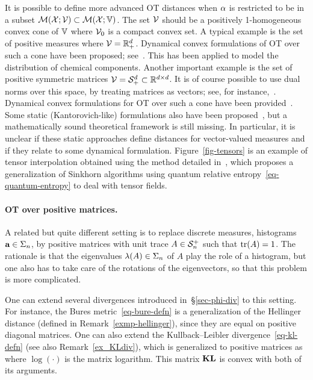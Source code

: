 It is possible to define more advanced OT distances when $\alpha$ is restricted to be in a subset $\mathcal{M}(\mathcal{X};\mathcal{V}) \subset \mathcal{M}(\mathcal{X};\mathbb{V})$. The set $\mathcal{V}$ should be a positively 1-homogeneous convex cone of $\mathbb{V}$
where $\mathcal{V}_0$ is a compact convex set. 
%
A typical example is the set of positive measures where $\mathcal{V}=\mathbb{R}_+^d$. Dynamical convex formulations of OT over such a cone have been proposed; see~\citep{MatthesPositive}. This has been applied to model the distribution of chemical components. 
%
Another important example is the set of positive symmetric matrices $\mathcal{V}=\mathcal{S}_+^d \subset \mathbb{R}^{d \times d}$. It is of course possible to use dual norms over this space, by treating matrices as vectors; see, for instance,~\citep{Ning2014metrics}. Dynamical convex  formulations for OT over such a cone have been provided~\citep{Chen2016,JiangSpectral}. Some static (Kantorovich-like) formulations also have been proposed~\citep{ning2015matrix,2016-peyre-qot}, but a mathematically sound theoretical framework is still missing. In particular, it is unclear if these static approaches define distances for vector-valued measures and if they relate to some dynamical formulation.  Figure~\ref{fig-tensors} is an example of tensor interpolation obtained using the method detailed in~\citep{2016-peyre-qot}, which proposes a generalization of Sinkhorn algorithms using quantum relative entropy~\eqref{eq-quantum-entropy} to deal with tensor fields.

\paragraph{OT over positive matrices. }

A related but quite different setting is to replace discrete measures, \ie histograms $\mathrm{\textbf{a}} \in \Sigma_n$, by positive matrices with unit trace $A \in \mathcal{S}_n^+$ such that $\operatorname{tr}(A)=1$. The rationale is that the eigenvalues $\lambda(A) \in \Sigma_n$ of $A$ play the role of a histogram, but one also has to take care of the rotations of the eigenvectors, so that this problem is more complicated.

One can extend several divergences introduced in~\S\ref{sec-phi-div} to this setting. For instance, the Bures metric~\eqref{eq-bure-defn} is a generalization of the Hellinger distance (defined in Remark~\ref{exmp-hellinger}), since they are equal on positive diagonal matrices. 
%
One can also extend the Kullback--Leibler divergence~\eqref{eq-kl-defn} (see also Remark~\ref{ex_KLdiv}), which is generalized to positive matrices as
where $\log(\cdot)$ is the matrix logarithm. This matrix $\mathrm{\textbf{KL}}$ is convex with both of its arguments. 

